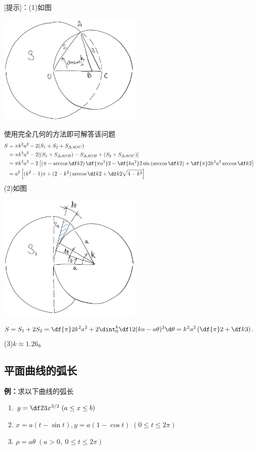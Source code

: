 [提示]：(1)如图
\begin{center}
	\includegraphics[width=7cm]{./images/ch6/goat-1.jpg}
\end{center}
使用完全几何的方法即可解答该问题
\begin{align*}
	S&=\pi k^2a^2-2(S_1+S_2+S_{\Delta AOC})\\
	&=\pi k^2a^2-2[(S_1+S_{\Delta AOB})-S_{\Delta AOB}+(S_2+S_{\Delta AOC})]\\
	&=\pi k^2a^2-2\left[\left(\pi-\arccos\df k2\right)\df{\pi a^2}2
	-\df{ka^2}2\sin\left(\arccos\df k2\right)+\df{\pi}2k^2a^2\arccos\df k2\right]\\
	&=a^2\left[(k^2-1)\pi+(2-k^2)\arccos\df k2+\df k2\sqrt{4-k^2}\right]
\end{align*}
(2)如图
\begin{center}
	\includegraphics[width=7cm]{./images/ch6/goat-2.jpg}
\end{center}
$$S=S_1+2S_2
=\df{\pi}2k^2a^2+2\dint_0^k\df12(ka-a\theta)^2\d\theta=k^2a^2
\left(\df{\pi}2+\df k3\right).$$
(3)$k\approx 1.26$。\fin

\subsection{平面曲线的弧长}

{\bf 例：}求以下曲线的弧长
\begin{enumerate}[(1)]
  \setlength{\itemindent}{1cm}
  \item $y=\df 23x^{3/2}\;(a\leq x\leq b)$
  \item $x=a(t-\sin t),y=a(1-\cos t)\;(0\leq t\leq 2\pi)$
  \item $\rho=a\theta\;(a>0,\;0\leq t\leq 2\pi)$
\end{enumerate}

